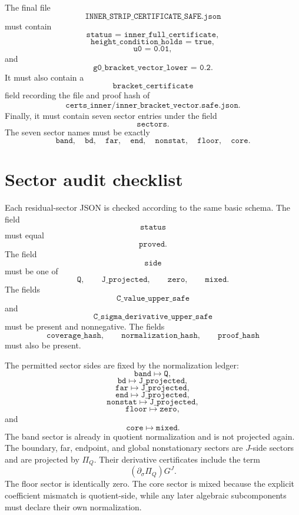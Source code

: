 \documentclass[11pt]{article}
\newcommand{\sig}{\sigma}
\newcommand{\PiQ}{\Pi_Q}
\newcommand{\JSON}[1]{\texttt{#1}}
\newcommand{\code}[1]{\texttt{#1}}
\newcommand{\Qside}{\texttt{Q}}
\newcommand{\Jproj}{\texttt{J\_projected}}
\newcommand{\Zeroside}{\texttt{zero}}
\newcommand{\Mixedside}{\texttt{mixed}}
\begin{document}
The final file
\[
        \code{INNER\_STRIP\_CERTIFICATE\_SAFE.json}
\]
must contain
\[
        \JSON{status = inner\_full\_certificate},
\]
\[
        \JSON{height\_condition\_holds = true},
\]
\[
        \JSON{u0 = 0.01},
\]
and
\[
        \JSON{g0\_bracket\_vector\_lower = 0.2}.
\]
It must also contain a
\[
        \JSON{bracket\_certificate}
\]
field recording the file and proof hash of
\[
        \code{certs\_inner/inner\_bracket\_vector.safe.json}.
\]
Finally, it must contain seven sector entries under the field
\[
        \JSON{sectors}.
\]
The seven sector names must be exactly
\[
        \JSON{band},
        \quad
        \JSON{bd},
        \quad
        \JSON{far},
        \quad
        \JSON{end},
        \quad
        \JSON{nonstat},
        \quad
        \JSON{floor},
        \quad
        \JSON{core}.
\]

\section{Sector audit checklist}

Each residual-sector JSON is checked according to the same basic schema.  The
field
\[
        \JSON{status}
\]
must equal
\[
        \JSON{proved}.
\]
The field
\[
        \JSON{side}
\]
must be one of
\[
        \Qside,
        \qquad
        \Jproj,
        \qquad
        \Zeroside,
        \qquad
        \Mixedside.
\]
The fields
\[
        \JSON{C\_value\_upper\_safe}
\]
and
\[
        \JSON{C\_sigma\_derivative\_upper\_safe}
\]
must be present and nonnegative.  The fields
\[
        \JSON{coverage\_hash},
        \qquad
        \JSON{normalization\_hash},
        \qquad
        \JSON{proof\_hash}
\]
must also be present.

The permitted sector sides are fixed by the normalization ledger:
\[
        \JSON{band} \mapsto \Qside,
\]
\[
        \JSON{bd} \mapsto \Jproj,
\]
\[
        \JSON{far} \mapsto \Jproj,
\]
\[
        \JSON{end} \mapsto \Jproj,
\]
\[
        \JSON{nonstat} \mapsto \Jproj,
\]
\[
        \JSON{floor} \mapsto \Zeroside,
\]
and
\[
        \JSON{core} \mapsto \Mixedside.
\]
The band sector is already in quotient normalization and is not projected
again.  The boundary, far, endpoint, and global nonstationary sectors are
\(J\)-side sectors and are projected by \(\PiQ\).  Their derivative
certificates include the term
\[
        (\partial_\sig\PiQ)G^J.
\]
The floor sector is identically zero.  The core sector is mixed because the
explicit coefficient mismatch is quotient-side, while any later algebraic
subcomponents must declare their own normalization.
\end{document}
